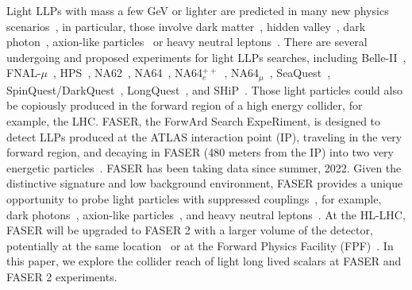 \documentclass[letterpaper,11pt]{article}
\begin{document}
Light LLPs with mass  a few GeV or lighter are predicted in many new physics scenarios~\cite{Egana-Ugrinovic:2019wzj, Kitahara:2019lws, Liu:2020qgx, Kling:2020mch, Baum:2021qzx, Athron:2021iuf}, in particular, those involve dark matter~\cite{Tucker-Smith:2001myb, Dienes:2011ja, Dienes:2011sa, Dienes:2012jb, Hochberg:2015vrg}, hidden valley~\cite{Strassler:2006im, Strassler:2006ri}, dark photon~\cite{Holdom:1985ag, Bauer:2018onh, Fabbrichesi:2020wbt, Caputo:2021eaa}, axion-like particles~\cite{Peccei:1977hh, Peccei:1977ur, Jaeckel:2010ni, Bauer:2017ris} or heavy neutral leptons~\cite{Gell-Mann:1979vob, Mohapatra:1979ia, Schechter:1980gr, Asaka:2005pn, Kersten:2007vk, Drewes:2015iva}.  There are several undergoing and proposed experiments for light LLPs searches, including  Belle-II~\cite{Belle-II:2010dht, Belle-II:2018jsg, Filimonova:2019tuy}, FNAL-$\mu$~\cite{Chen:2017awl, Marsicano:2018vin}, HPS~\cite{Celentano:2014wya, HPS:2018xkw, Moreno:2018tlx}, NA62~\cite{Lanfranchi:2017wzl, NA62:2017rwk}, NA64~\cite{NA64:2016oww, Gninenko:2019qiv, Banerjee:2019pds, NA64:2020qwq}, NA64$_e^{++}$~\cite{Gninenko:2300189}, NA64$_\mu$~\cite{Gninenko:2640930}, SeaQuest~\cite{SeaQuest:2017kjt, Liu:2017ryd}, SpinQuest/DarkQuest~\cite{Berlin:2018pwi, Batell:2020vqn, Blinov:2021say, Apyan:2022tsd}, LongQuest~\cite{Tsai:2019buq}, and SHiP~\cite{Bonivento:2013jag, Alekhin:2015byh, SHiP:2015vad}.  Those light particles could also be copiously produced in the forward region of a high energy collider, for example, the LHC.    FASER, the ForwArd Search ExpeRiment, is designed to detect LLPs produced at the ATLAS interaction point (IP),   traveling in the very forward region,  and decaying in FASER (480 meters from the IP) into two very energetic particles~\cite{Feng:2017uoz, FASER:2018ceo, FASER:2018bac, FASER:2022hcn, FASER:2021ljd,FASER:2021cpr}.   FASER has been taking data since summer, 2022.    Given the distinctive signature and low background environment,  FASER provides a unique opportunity to probe light particles with suppressed couplings~\cite{Feng:2017uoz, FASER:2018eoc, FASER:2018bac}, for example, dark photons~\cite{Feng:2017uoz}, axion-like particles~\cite{Feng:2018pew}, and heavy neutral leptons~\cite{Kling:2018wct}.   At the HL-LHC,   FASER will be upgraded to FASER 2 with a larger volume of the detector, potentially at the same location~\cite{FASER:2018eoc} or at the Forward Physics Facility (FPF)~\cite{Anchordoqui:2021ghd, Feng:2022inv}.  In this paper, we explore the collider reach of light long lived scalars at FASER and FASER 2 experiments. 
 
\end{document}

